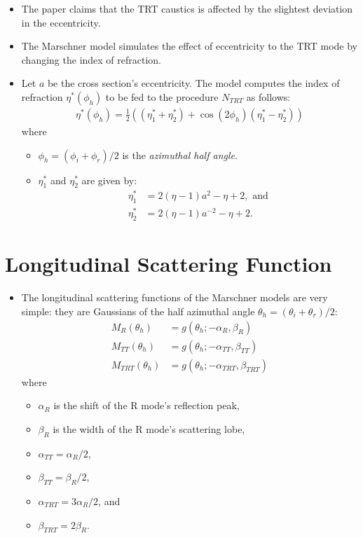 \documentclass[10pt]{article}
\begin{document}
  \begin{itemize}
    \item The paper claims that the TRT caustics is affected
      by the slightest deviation in the eccentricity. 
      
    \item The Marschner model simulates the effect of eccentricity
      to the TRT mode by changing the index of refraction.
      
    \item Let $a$ be the cross section's eccentricity.
      The model computes the index of refraction $\eta^*(\phi_h)$
      to be fed to the procedure $N_{TRT}$ as follows:
      \begin{align*}
        \eta^*(\phi_h) = \frac{1}{2}((\eta^*_1 + \eta^*_2) 
          + \cos(2\phi_h)(\eta^*_1 - \eta^*_2))
      \end{align*}
      where
      \begin{itemize}
        \item $\phi_h = (\phi_i + \phi_r)/2$ is the \emph{azimuthal half angle}.
        \item $\eta^*_1$ and $\eta^*_2$ are given by:
        \begin{align*}
          \eta^*_1 &= 2(\eta-1)a^2 - \eta +2,\mbox{ and}\\
          \eta^*_2 &= 2(\eta-1)a^{-2} - \eta + 2.
        \end{align*}
      \end{itemize}
  \end{itemize}
  
  \section{Longitudinal Scattering Function}
  
  \begin{itemize}
    \item The longitudinal scattering functions of the
      Marschner models are very simple: they are Gaussians
      of the half azimuthal angle 
      $\theta_h = (\theta_i + \theta_r)/2$:
      \begin{align*}
        M_R(\theta_h) &= g(\theta_h; -\alpha_R, \beta_R)\\
        M_{TT}(\theta_h) &= g(\theta_h; -\alpha_{TT}, \beta_{TT})\\
        M_{TRT}(\theta_h) &= g(\theta_h; -\alpha_{TRT}, \beta_{TRT})
      \end{align*}
      where
      \begin{itemize}
        \item $\alpha_R$ is the shift of the R mode's 
          reflection peak,
        \item $\beta_R$ is the width of 
          the R mode's scattering lobe,
        \item $\alpha_{TT} = \alpha_R / 2$,
        \item $\beta_{TT} = \beta_R/2$,
        \item $\alpha_{TRT} = 3\alpha_R/2$, and
        \item $\beta_{TRT} = 2\beta_R$.
      \end{itemize}
  \end{itemize}
  
\end{document}
